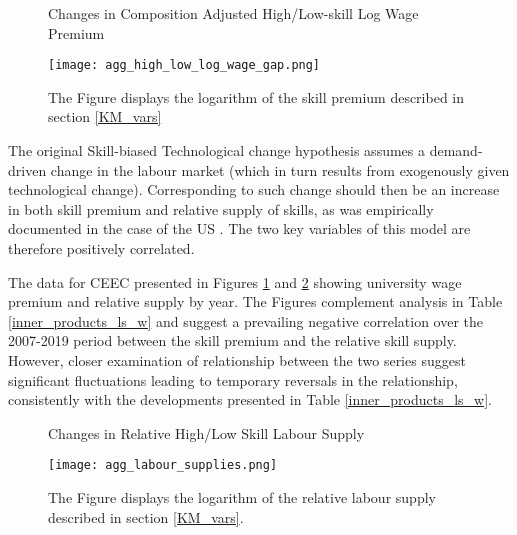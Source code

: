 \documentclass[11pt]{article}
\begin{document}
\begin{figure}[!htbp]%
    \centering
    \caption{Changes in Composition Adjusted High/Low-skill Log Wage Premium}
    {\texttt{[image: agg\_high\_low\_log\_wage\_gap.png]} }
    \label{agg_high_low_log_wage_gap}
    \caption*{\footnotesize The Figure displays the logarithm of the skill premium described in section \ref{KM_vars}}
\end{figure}

The original Skill-biased Technological change hypothesis assumes a demand-driven change in the labour market (which in turn results from exogenously given technological change). Corresponding to such change should then be an increase in both skill premium and relative supply of skills, as was empirically documented in the case of the US \citep{acemoglu2011skills}. The two key variables of this model are therefore positively correlated. 

The data for CEEC presented in Figures \ref{agg_high_low_log_wage_gap} and \ref{agg_labour_supplies} showing university wage premium and relative supply by year. The Figures complement analysis in Table \ref{inner_products_ls_w} and suggest a prevailing negative correlation over the 2007-2019 period between the skill premium and the relative skill supply. However, closer examination of relationship between the two series suggest significant fluctuations leading to temporary reversals in the relationship, consistently with the developments presented in Table \ref{inner_products_ls_w}.  %


\begin{figure}[!htbp]%
    \centering
    \caption{Changes in Relative High/Low Skill Labour Supply}
    {\texttt{[image: agg\_labour\_supplies.png]} }
    \label{agg_labour_supplies}
    \caption*{\footnotesize The Figure displays the logarithm of the relative labour supply described in section \ref{KM_vars}.}
\end{figure}
\end{document}
